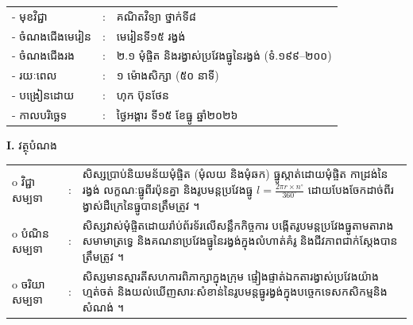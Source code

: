 \documentclass[a4paper,10pt]{article}
\newcommand{\wcirc}{{\CourierBullet\fontsize{9.5pt}{11pt}\selectfont o}}
\begin{document}
{\renewcommand{\arraystretch}{0.95}
\hspace*{4.05cm}%
\begin{tabular}{@{}l l l@{}}
  - \hspace{0.35cm} មុខវិជ្ជា & : & គណិតវិទ្យា ថ្នាក់ទី៨ \\
  - \hspace{0.35cm} ចំណងជើងមេរៀន & : & មេរៀនទី១៥ រង្វង់ \\
  - \hspace{0.35cm} ចំណងជើងរង & : & ២.១ មុំផ្ចិត និងរង្វាស់ប្រវែងធ្នូនៃរង្វង់ (ទំ.១៩៩--២០០) \\
  - \hspace{0.35cm} រយៈពេល & : & ១ ម៉ោងសិក្សា (៥០ នាទី) \\
  - \hspace{0.35cm} បង្រៀនដោយ & : & ហុក ប៊ុនថែន \\
  - \hspace{0.35cm} កាលបរិច្ឆេទ & : & ថ្ងៃអង្គារ ទី១៥ ខែធ្នូ ឆ្នាំ២០២៦ \\
\end{tabular}

\vspace{1pt}

\textbf{I.} {\muol វត្ថុបំណង}\\[1pt]
\hspace*{0.55cm}%
\begin{tabular}{@{}l l L{14.2cm}@{}}
  \wcirc \hspace{0.25cm} វិជ្ជាសម្បទា & : & សិស្សប្រាប់និយមន័យមុំផ្ចិត (មុំលយ និងមុំឆក) ធ្នូស្កាត់ដោយមុំផ្ចិត កាដ្រង់នៃរង្វង់ លក្ខណៈធ្នូពីរប៉ុនគ្នា និងរូបមន្តប្រវែងធ្នូ $l = \frac{2\pi r \times n^\circ}{360^\circ}$ ដោយបែងចែកដាច់ពីរង្វាស់ដឺក្រេនៃធ្នូបានត្រឹមត្រូវ ។ \\
  \wcirc \hspace{0.25cm} បំណិនសម្បទា & : & សិស្សវាស់មុំផ្ចិតដោយរ៉ាប់ព័រទ័រលើសន្លឹកកិច្ចការ បង្កើតរូបមន្តប្រវែងធ្នូតាមតារាងសមាមាត្រទ្វេ និងគណនាប្រវែងធ្នូនៃរង្វង់ក្នុងលំហាត់គំរូ និងជីវភាពជាក់ស្ដែងបានត្រឹមត្រូវ ។ \\
  \wcirc \hspace{0.25cm} ចរិយាសម្បទា & : & សិស្សមានស្មារតីសហការពិភាក្សាក្នុងក្រុម ផ្ទៀងផ្ទាត់ឯកតារង្វាស់ប្រវែងយ៉ាងហ្មត់ចត់ និងយល់ឃើញសារៈសំខាន់នៃរូបមន្តធ្នូរង្វង់ក្នុងបច្ចេកទេសកសិកម្មនិងសំណង់ ។ \\
\end{tabular}

\vspace{1pt}

}
\end{document}
